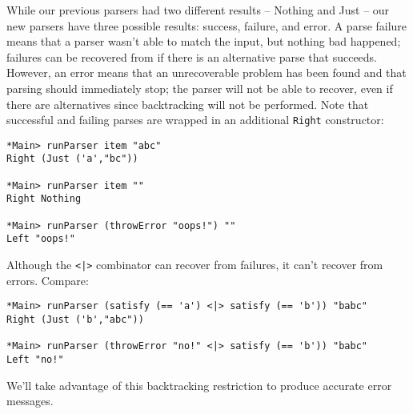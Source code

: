 \documentclass{tmr}
\begin{document}
While our previous parsers had two different results -- Nothing and Just --
our new parsers have three possible results:  success, failure, and error. 
A parse failure means that a parser wasn't able to match the input, but
nothing bad happened; failures can be recovered from if there is an alternative
parse that succeeds.  However, an error means that an unrecoverable problem
has been found and that parsing should immediately stop; the parser will
not be able to recover, even if there are alternatives since backtracking
will not be performed.
Note that successful and failing parses are wrapped in an additional \verb+Right+
constructor:
\begin{verbatim}
*Main> runParser item "abc"
Right (Just ('a',"bc"))

*Main> runParser item ""
Right Nothing

*Main> runParser (throwError "oops!") ""
Left "oops!"
\end{verbatim}

Although the \verb+<|>+ combinator can recover from failures, it can't recover from
errors.  Compare:
\begin{verbatim}
*Main> runParser (satisfy (== 'a') <|> satisfy (== 'b')) "babc"
Right (Just ('b',"abc"))

*Main> runParser (throwError "no!" <|> satisfy (== 'b')) "babc"
Left "no!"
\end{verbatim}

We'll take advantage of this backtracking restriction to produce accurate error
messages.
\end{document}
